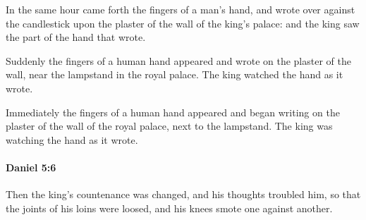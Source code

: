 			\begin{versebox}
					\item[BHS] 
					\item[LXX] 
					\item[ASV] In the same hour came forth the fingers of a man's hand, and wrote over against the candlestick upon the plaster of the wall of the king's palace: and the king saw the part of the hand that wrote.
					\item[NIV] Suddenly the fingers of a human hand appeared and wrote on the plaster of the wall, near the lampstand in the royal palace. The king watched the hand as it wrote.
					\item[NRSV] Immediately the fingers of a human hand appeared and began writing on the plaster of the wall of the royal palace, next to the lampstand. The king was watching the hand as it wrote.
			\end{versebox}

		\paragraph{Daniel 5:6} %
			\label{DANIEL-5-6}

			Then the king’s countenance was changed, and his thoughts troubled him, so that the joints of his loins were loosed, and his knees smote one against another.


